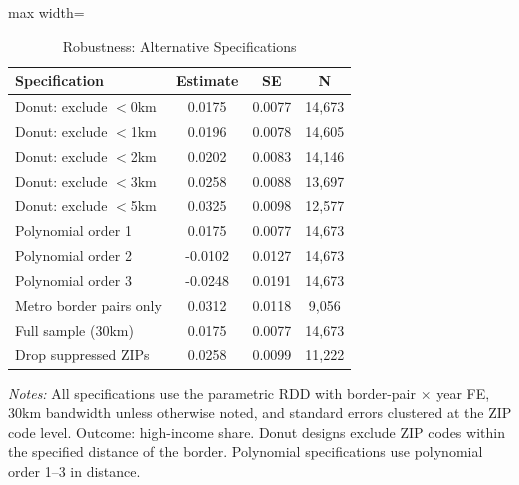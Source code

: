 \begin{table}[htbp]
\centering
\caption{Robustness: Alternative Specifications}
\label{tab:robustness}
\begin{adjustbox}{max width=\textwidth}
\begin{tabular}{lccc}
  \hline
Specification & Estimate & SE & N \\ 
  \hline
Donut: exclude $<$0km & 0.0175 & 0.0077 & 14,673 \\ 
  Donut: exclude $<$1km & 0.0196 & 0.0078 & 14,605 \\ 
  Donut: exclude $<$2km & 0.0202 & 0.0083 & 14,146 \\ 
  Donut: exclude $<$3km & 0.0258 & 0.0088 & 13,697 \\ 
  Donut: exclude $<$5km & 0.0325 & 0.0098 & 12,577 \\ 
  Polynomial order 1 &  0.0175 & 0.0077 & 14,673 \\ 
  Polynomial order 2 & -0.0102 & 0.0127 & 14,673 \\ 
  Polynomial order 3 & -0.0248 & 0.0191 & 14,673 \\ 
  Metro border pairs only & 0.0312 & 0.0118 & 9,056 \\ 
  Full sample (30km) & 0.0175 & 0.0077 & 14,673 \\ 
  Drop suppressed ZIPs & 0.0258 & 0.0099 & 11,222 \\ 
   \hline
\end{tabular}
\end{adjustbox}
\begin{tablenotes}\small
\item \textit{Notes:} All specifications use the parametric RDD with border-pair $\times$ year FE, 30km bandwidth unless otherwise noted, and standard errors clustered at the ZIP code level. Outcome: high-income share. Donut designs exclude ZIP codes within the specified distance of the border. Polynomial specifications use polynomial order 1--3 in distance.
\end{tablenotes}
\end{table}
